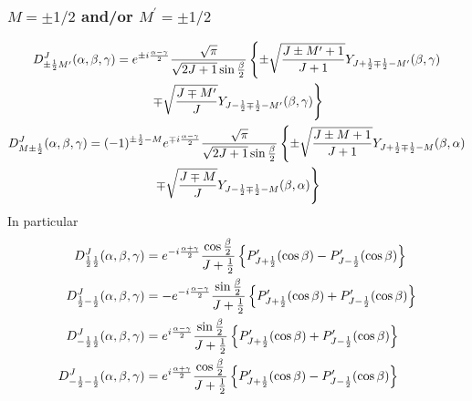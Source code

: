 \subsubsection{ $M= \pm 1 / 2$ and/or $M^{\prime}= \pm 1 / 2$}
\begin{gather}
D_{ \pm \frac{1}{2} M^{\prime}}^{J}(\alpha, \beta, \gamma)=e^{ \pm i \frac{\alpha-\gamma}{2}} \frac{\sqrt{\pi}}{\sqrt{2 J+1} \sin \frac{\beta}{2}}\left\{ \pm \sqrt{\frac{J \pm M^{\prime}+1}{J+1}} Y_{J+\frac{1}{2} \mp \frac{1}{2}-M^{\prime}}(\beta, \gamma)\right.  \notag\\
\left.\mp \sqrt{\frac{J \mp M^{\prime}}{J}} Y_{J-\frac{1}{2} \mp \frac{1}{2}-M^{\prime}}(\beta, \gamma)\right\}  \notag\\
D_{M \pm \frac{1}{2}}^{J}(\alpha, \beta, \gamma)=(-1)^{ \pm \frac{1}{2}-M} e^{\mp i \frac{\alpha-\gamma}{2}} \frac{\sqrt{\pi}}{\sqrt{2 J+1} \sin \frac{\beta}{2}}\left\{ \pm \sqrt{\frac{J \pm M+1}{J+1}} Y_{J+\frac{1}{2} \mp \frac{1}{2}-M}(\beta, \alpha)\right.  \label{eq:4:17:3}\\
\left.\mp \sqrt{\frac{J \mp M}{J}} Y_{J-\frac{1}{2} \mp \frac{1}{2}-M}(\beta, \alpha)\right\} \notag
\end{gather}
In particular
\begin{align}
D_{\frac{1}{2} \frac{1}{2}}^{J}(\alpha, \beta, \gamma) & =e^{-i \frac{\alpha+\gamma}{2}} \frac{\cos \frac{\beta}{2}}{J+\frac{1}{2}}\left\{P_{J+\frac{1}{2}}^{\prime}(\cos \beta)-P_{J-\frac{1}{2}}^{\prime}(\cos \beta)\right\}  \notag\\
D_{\frac{1}{2}-\frac{1}{2}}^{J}(\alpha, \beta, \gamma) & =-e^{-i \frac{\alpha-\gamma}{2}} \frac{\sin \frac{\beta}{2}}{J+\frac{1}{2}}\left\{P_{J+\frac{1}{2}}^{\prime}(\cos \beta)+P_{J-\frac{1}{2}}^{\prime}(\cos \beta)\right\}  \notag\\
D_{-\frac{1}{2} \frac{1}{2}}^{J}(\alpha, \beta, \gamma) & =e^{i \frac{\alpha-\gamma}{2}} \frac{\sin \frac{\beta}{2}}{J+\frac{1}{2}}\left\{P_{J+\frac{1}{2}}^{\prime}(\cos \beta)+P_{J-\frac{1}{2}}^{\prime}(\cos \beta)\right\}  \label{eq:4:17:4}\\
D_{-\frac{1}{2}-\frac{1}{2}}^{J}(\alpha, \beta, \gamma) & =e^{i \frac{\alpha+\gamma}{2}} \frac{\cos \frac{\beta}{2}}{J+\frac{1}{2}}\left\{P_{J+\frac{1}{2}}^{\prime}(\cos \beta)-P_{J-\frac{1}{2}}^{\prime}(\cos \beta)\right\} \notag
\end{align}
